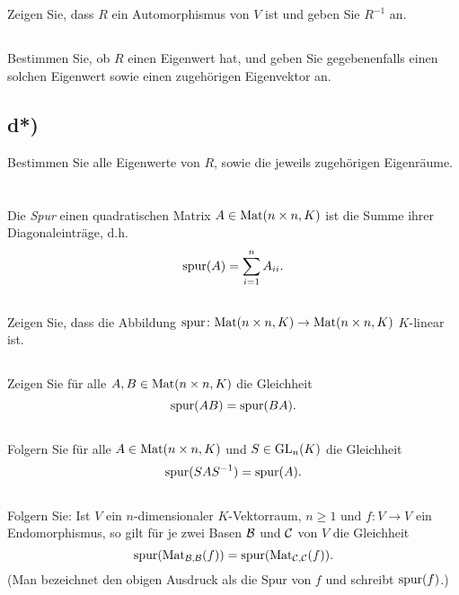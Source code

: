 \documentclass[a4paper,9pt]{extarticle}
\begin{document}
\subsection{}
Zeigen Sie, dass $R$ ein Automorphismus von $V$ ist und geben Sie $R^{-1}$ an.

\subsection{}
Bestimmen Sie, ob $R$ einen Eigenwert hat, und geben Sie gegebenenfalls einen solchen Eigenwert sowie einen zugehörigen Eigenvektor an.

\subsection*{d*)}
Bestimmen Sie alle Eigenwerte von $R$, sowie die jeweils zugehörigen Eigenräume.





\section{}
Die \emph{Spur} einen quadratischen Matrix $A \in \mathrm{Mat}(n \times n, K)$ ist die Summe ihrer Diagonaleinträge, d.h.
\[
 \mathrm{spur}(A) = \sum_{i=1}^n A_{ii}.
\]

\subsection{}
Zeigen Sie, dass die Abbildung $\mathrm{spur} \colon \mathrm{Mat}(n \times n, K) \to \mathrm{Mat}(n \times n, K)$ $K$-linear ist.

\subsection{}
Zeigen Sie für alle $A, B \in \mathrm{Mat}(n \times n, K)$ die Gleichheit
\[
 \mathrm{spur}(AB) = \mathrm{spur}(BA).
\]

\subsection{}
Folgern Sie für alle $A \in \mathrm{Mat}(n \times n, K)$ und $S \in \mathrm{GL}_n(K)$ die Gleichheit
\[
 \mathrm{spur}(SAS^{-1}) = \mathrm{spur}(A).
\]

\subsection{}
Folgern Sie: Ist $V$ ein $n$-dimensionaler $K$-Vektorraum, $n \geq 1$ und $f \colon V \to V$ ein Endomorphismus, so gilt für je zwei Basen $\mathcal{B}$ und $\mathcal{C}$ von $V$ die Gleichheit
\[
 \mathrm{spur}(\mathrm{Mat}_{\mathcal{B},\mathcal{B}}(f)) = \mathrm{spur}(\mathrm{Mat}_{\mathcal{C},\mathcal{C}}(f)).
\]
(Man bezeichnet den obigen Ausdruck als die Spur von $f$ und schreibt $\mathrm{spur}(f)$.)
\end{document}
